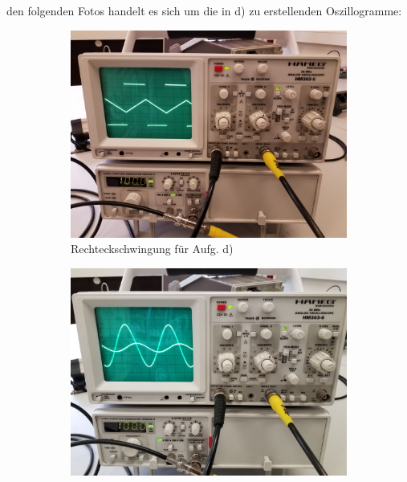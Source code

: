    \justifying den folgenden Fotos handelt es sich um die in d) zu erstellenden Oszillogramme:

  \begin{figure}[H]
  \centering
  \caption{Schwingungstypen}
  \vspace{+1em}
    \begin{subfigure}{0.48\linewidth}
      \includegraphics[width=\textwidth]{images/rechteck.jpg}
      \centering
      \caption{Rechteckschwingung für Aufg. d)}
      \label{fig:rechteck}
    \end{subfigure}
    \begin{subfigure}{0.48\linewidth}
      \includegraphics[width=\textwidth]{images/sinus.jpg}

\end{subfigure}
\end{figure}
